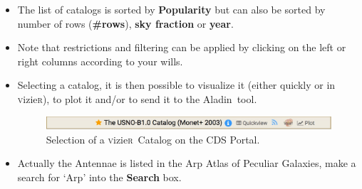 \documentclass [a4paper, 12pt]{article}
\newcommand{\aladin}{{\textsc{A}{ladin}}}
\newcommand{\vizier}{{\textsc{v}izie\textsc{r}}}
\begin{document}
\begin{itemize}
\item The list of catalogs is sorted by \textbf{Popularity} but can 
also be sorted by number of rows (\textbf{\#rows}), \textbf{sky 
fraction} or \textbf{year}. 
\item Note that restrictions and filtering can be applied by clicking 
on the left or right columns according to your wills.
\item Selecting a catalog, it is then possible to visualize it (either 
quickly or in \vizier), to plot it and/or to send it to the \aladin\ 
tool.
\begin{figure}[H]
\center
\includegraphics[width=1  \textwidth]{../images/cdsportal_table_usno.jpg}
\caption{Selection of a \vizier\ Catalog on the CDS Portal.}
\label{fig:cdsportal5}
\end{figure}
\item Actually the Antennae is listed in the Arp Atlas of Peculiar 
Galaxies, make a search for `Arp' into the \textbf{Search} box.


\end{itemize}
\end{document}
